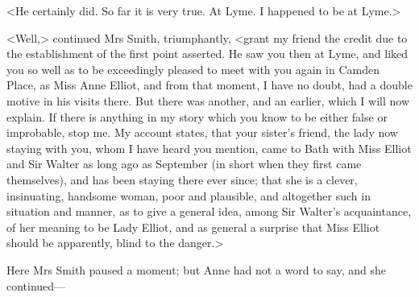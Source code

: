 <He certainly did. So far it is very true. At Lyme. I happened to be at Lyme.>

<Well,> continued Mrs Smith, triumphantly, <grant my friend the credit due to the establishment of the first point asserted. He saw you then at Lyme, and liked you so well as to be exceedingly pleased to meet with you again in Camden Place, as Miss Anne Elliot, and from that moment, I have no doubt, had a double motive in his visits there. But there was another, and an earlier, which I will now explain. If there is anything in my story which you know to be either false or improbable, stop me. My account states, that your sister's friend, the lady now staying with you, whom I have heard you mention, came to Bath with Miss Elliot and Sir Walter as long ago as September (in short when they first came themselves), and has been staying there ever since; that she is a clever, insinuating, handsome woman, poor and plausible, and altogether such in situation and manner, as to give a general idea, among Sir Walter's acquaintance, of her meaning to be Lady Elliot, and as general a surprise that Miss Elliot should be apparently, blind to the danger.>

Here Mrs Smith paused a moment; but Anne had not a word to say, and she continued—

